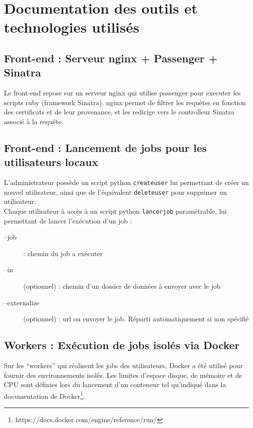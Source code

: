 \newpage

\chapter{Documentation des outils et technologies utilisés}

\section{Front-end : Serveur nginx + Passenger + Sinatra}

Le front-end repose sur un serveur nginx qui utilise passenger pour executer les scripts ruby (framework Sinatra).
nginx permet de filtrer les requêtes en fonction des certificats et de leur provenance, et les redirige vers le controlleur Sinatra associé à la requête.

\section{Front-end : Lancement de jobs pour les utilisateurs locaux} 

L'administrateur possède un script python {\tt createuser} lui permettant de créer un nouvel utilisateur, ainsi que de l'équivalent {\tt deleteuser} pour supprimer un utilisateur. \\

Chaque utilisateur à accès à un script python {\tt lancerjob} paramétrable, lui permettant de lancer l'exécution d'un job :\\
\begin{description}
	\item[--job] : chemin du job a exécuter
	\item[--in] (optionnel) : chemin d'un dossier de données à envoyer avec le job
	\item[--externalize] (optionnel) : url ou envoyer le job. Réparti automatiquement si non spécifié
\end{description}

\section{Workers : Exécution de jobs isolés via Docker}

Sur les ``workers'' qui réalisent les jobs des utilisateurs, Docker a été utilisé pour fournir des environnements
isolés. Les limites d'espace disque, de mémoire et de CPU sont définies lors du lancement d'un conteneur tel qu'indiqué
dans la documentation de Docker\footnote{https://docs.docker.com/engine/reference/run/}.

